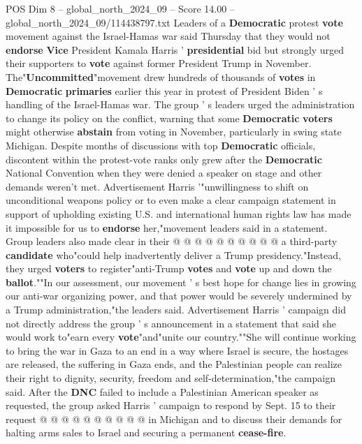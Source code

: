 \begin{textsample}{POS Dim 8 – global\_north\_2024\_09 – Score 14.00 – global\_north\_2024\_09/114438797.txt}  \label{ex:f8_pos_087}
Leaders of a \textbf{Democratic} protest \textbf{vote} movement against the Israel-Hamas war said Thursday that they would not \textbf{endorse} \textbf{Vice} President Kamala Harris ' \textbf{presidential} bid but strongly urged their supporters to \textbf{vote} against former President Trump in November.
The"\textbf{Uncommitted}"movement drew hundreds of thousands of \textbf{votes} in \textbf{Democratic} \textbf{primaries} earlier this year in protest of President Biden ' s handling of the Israel-Hamas war.
The group ' s leaders urged the administration to change its policy on the conflict, warning that some \textbf{Democratic} \textbf{voters} might otherwise \textbf{abstain} from voting in November, particularly in swing state Michigan.
Despite months of discussions with top \textbf{Democratic} officials, discontent within the protest-vote ranks only grew after the \textbf{Democratic} National Convention when they were denied a speaker on stage and other demands weren't met.
Advertisement Harris '"unwillingness to shift on unconditional weapons policy or to even make a clear campaign statement in support of upholding existing U.S. and international human rights law has made it impossible for us to \textbf{endorse} her,"movement leaders said in a statement.
Group leaders also made clear in their @ @ @ @ @ @ @ @ @ @ a third-party \textbf{candidate} who"could help inadvertently deliver a Trump presidency."Instead, they urged \textbf{voters} to register"anti-Trump \textbf{votes} and \textbf{vote} up and down the \textbf{ballot}.""In our assessment, our movement ' s best hope for change lies in growing our anti-war organizing power, and that power would be severely undermined by a Trump administration,"the leaders said.
Advertisement Harris ' campaign did not directly address the group ' s announcement in a statement that said she would work to"earn every \textbf{vote}"and"unite our country.""She will continue working to bring the war in Gaza to an end in a way where Israel is secure, the hostages are released, the suffering in Gaza ends, and the Palestinian people can realize their right to dignity, security, freedom and self-determination,"the campaign said.
After the \textbf{DNC} failed to include a Palestinian American speaker as requested, the group asked Harris ' campaign to respond by Sept. 15 to their request @ @ @ @ @ @ @ @ @ @ in Michigan and to discuss their demands for halting arms sales to Israel and securing a permanent \textbf{cease-fire}.

\end{textsample}
